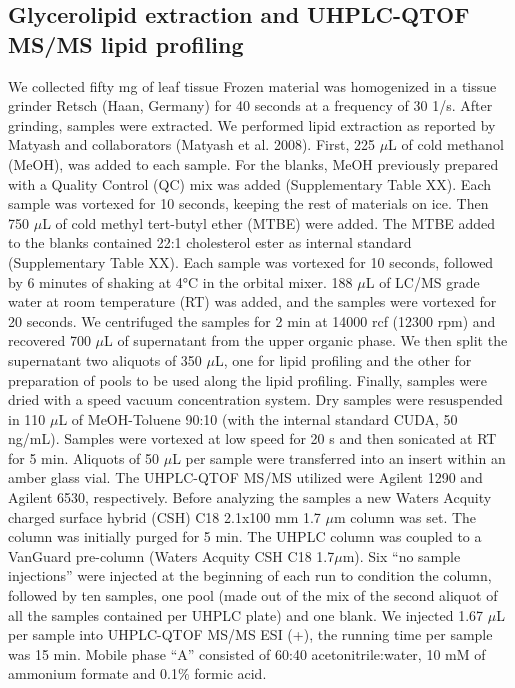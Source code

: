 \documentclass[9pt,twocolumn,twoside]{BioRxiv}
\begin{document}
\subsection{Glycerolipid extraction and UHPLC-QTOF MS/MS lipid profiling} 
We collected fifty mg of leaf tissue  Frozen material was homogenized in a tissue grinder Retsch (Haan, Germany) for 40 seconds at a frequency of 30 1/s. After grinding, samples were extracted. 
We performed lipid extraction as reported by Matyash and collaborators (Matyash et al. 2008). 
First, 225 $\mu$L of cold methanol (MeOH), was added to each sample. 
For the blanks, MeOH previously prepared with a Quality Control (QC) mix was added (Supplementary Table XX). Each sample was vortexed for 10 seconds, keeping the rest of materials on ice. 
Then 750 $\mu$L of cold methyl tert-butyl ether (MTBE) were added. The MTBE added to the blanks contained 22:1 cholesterol ester as internal standard (Supplementary Table XX). 
Each sample was vortexed for 10 seconds, followed by 6 minutes of shaking at 4°C in the orbital mixer. 
188 $\mu$L of LC/MS grade water at room temperature (RT) was added, and the samples were vortexed for 20 seconds.
We centrifuged the samples for 2 min at 14000 rcf (12300 rpm) and recovered 700 $\mu$L of supernatant from the upper organic phase. 
We then split the supernatant two aliquots of 350 $\mu$L, one for lipid profiling and the other for preparation of pools to be used along the lipid profiling. 
Finally, samples were dried with a speed vacuum concentration system.
Dry samples were resuspended in 110 $\mu$L of MeOH-Toluene 90:10 (with the internal standard CUDA, 50 ng/mL). 
Samples were vortexed at low speed for 20 s and then sonicated at RT for 5 min. 
Aliquots of 50 $\mu$L per sample were transferred into an insert within an amber glass vial.
The UHPLC-QTOF MS/MS utilized were Agilent 1290 and Agilent 6530, respectively. 
Before analyzing the samples a new Waters Acquity charged surface hybrid (CSH) C18 2.1x100 mm 1.7 $\mu$m column was set. 
The column was initially purged for 5 min. 
The UHPLC column was coupled to a VanGuard pre-column (Waters Acquity CSH C18 1.7$\mu$m). 
Six “no sample injections” were injected at the beginning of each run to condition the column, followed by ten samples, one pool (made out of the mix of the second aliquot of all the samples contained per UHPLC plate) and one blank.
We injected 1.67 $\mu$L per sample into UHPLC-QTOF MS/MS ESI (+), the running time per sample was 15 min. Mobile phase “A” consisted of 60:40 acetonitrile:water, 10 mM of ammonium formate and 0.1\% formic acid. 
\end{document}
